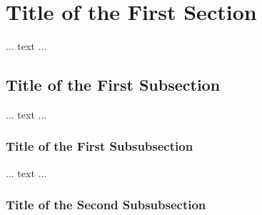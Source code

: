\documentclass[a4paper]{article}
\begin{document}
\tableofcontents

\section{Title of the First Section}
... text ... 
\subsection{Title of the First Subsection}
... text ... 
\subsubsection{Title of the First Subsubsection}
... text ... 
\subsubsection*{Title of the Second Subsubsection} 
\end{document}
